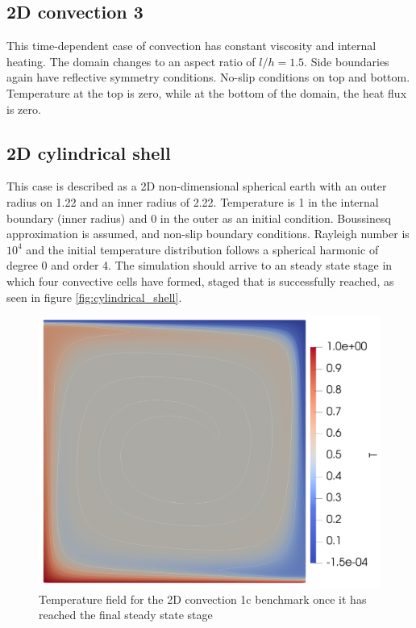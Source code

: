\subsection{2D convection 3}
This time-dependent case of convection has constant viscosity and internal heating. The domain changes to an aspect ratio of $l/h = 1.5$. Side boundaries again have reflective symmetry conditions. No-slip conditions on top and bottom. Temperature at the top is zero, while at the bottom of the domain, the heat flux is zero.


\subsection{2D cylindrical shell}
This case is described as a 2D non-dimensional spherical earth with an outer radius on 1.22 and an inner radius of 2.22. Temperature is 1 in the internal boundary (inner radius) and 0 in the outer as an initial condition. Boussinesq approximation is assumed, and non-slip boundary conditions. Rayleigh number is $10^4$ and the initial temperature distribution follows a spherical harmonic of degree 0 and order 4.
The simulation should arrive to an steady state stage in which four convective cells have formed, staged that is successfully reached, as seen in figure \ref{fig:cylindrical_shell}.

\begin{figure}
	\centering
	\includegraphics[width=0.75\linewidth]{img/chapter2/benchmarks/contours.png}
	\caption{Temperature field for the 2D convection 1c benchmark once it has reached the final steady state stage}
	\label{fig:convection_1c}
\end{figure}


